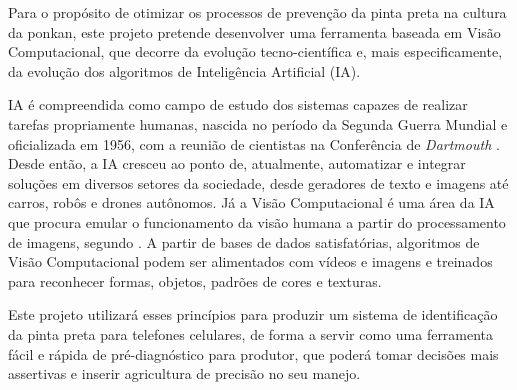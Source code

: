 Para o propósito de otimizar os processos de prevenção da pinta preta na cultura da ponkan, este projeto pretende desenvolver uma ferramenta baseada em Visão Computacional, que decorre da evolução tecno-científica e, mais especificamente, da evolução dos algoritmos de Inteligência Artificial (IA). 

IA é compreendida como campo de estudo dos sistemas capazes de realizar tarefas propriamente humanas, nascida no período da Segunda Guerra Mundial e oficializada em 1956, com a reunião de cientistas na Conferência de \emph{Dartmouth} \cite{coelho2012turing}. Desde então, a IA cresceu ao ponto de, atualmente, automatizar e integrar soluções em diversos setores da sociedade, desde geradores de texto e imagens até carros, robôs e drones autônomos. Já a Visão Computacional é uma área da IA que procura emular o funcionamento da visão humana a partir do processamento de imagens, segundo \textcite{marengoni2009opencv}. A partir de bases de dados satisfatórias, algoritmos de Visão Computacional podem ser alimentados com vídeos e imagens e treinados para reconhecer formas, objetos, padrões de cores e texturas.

Este projeto utilizará esses princípios para produzir um sistema de identificação da pinta preta para telefones celulares, de forma a servir como uma ferramenta fácil e rápida de pré-diagnóstico para produtor, que poderá tomar decisões mais assertivas e inserir agricultura de precisão no seu manejo.